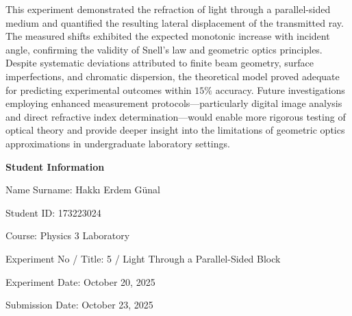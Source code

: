 \documentclass[12pt, a4paper]{article}
\begin{document}
This experiment demonstrated the refraction of light through a parallel-sided medium and quantified the resulting lateral displacement of the transmitted ray. The measured shifts exhibited the expected monotonic increase with incident angle, confirming the validity of Snell's law and geometric optics principles. Despite systematic deviations attributed to finite beam geometry, surface imperfections, and chromatic dispersion, the theoretical model proved adequate for predicting experimental outcomes within $15\%$ accuracy. Future investigations employing enhanced measurement protocols—particularly digital image analysis and direct refractive index determination—would enable more rigorous testing of optical theory and provide deeper insight into the limitations of geometric optics approximations in undergraduate laboratory settings.

\newpage

\textbf{Student Information}

Name Surname: Hakkı Erdem Günal

Student ID: 173223024

Course: Physics 3 Laboratory

Experiment No / Title: 5 / Light Through a Parallel-Sided Block

Experiment Date: October 20, 2025

Submission Date: October 23, 2025
\end{document}
